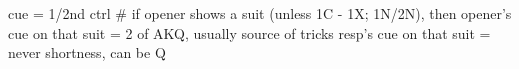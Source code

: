 cue = 1/2nd ctrl
# if opener shows a suit (unless 1C - 1X; 1N/2N), then
opener's cue on that suit = 2 of AKQ, usually source of tricks
resp's cue on that suit = never shortness, can be Q